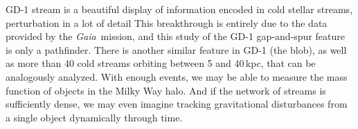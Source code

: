 \documentclass[twocolumn]{aastex62}
\newcommand{\acronym}[1]{{\small{#1}}}
\newcommand{\gaia}{\textsl{Gaia}}
\newcommand{\lcdm}{\acronym{$\Lambda$CDM}}
\newcommand{\msun}{\textrm{M}_\odot}
\begin{document}
GD-1 stream is a beautiful display of information encoded in cold stellar streams, perturbation in a lot of detail
This breakthrough is entirely due to the data provided by the \gaia\ mission, and this study of the GD-1 gap-and-spur feature is only a pathfinder.
There is another similar feature in GD-1 (the blob), as well as more than 40 cold streams orbiting between 5 and 40\,kpc, that can be analogously analyzed.
With enough events, we may be able to measure the mass function of objects in the Milky Way halo.
And if the network of streams is sufficiently dense, we may even imagine tracking gravitational disturbances from a single object dynamically through time.


%
%
%
%
%
%
%
%
\end{document}
